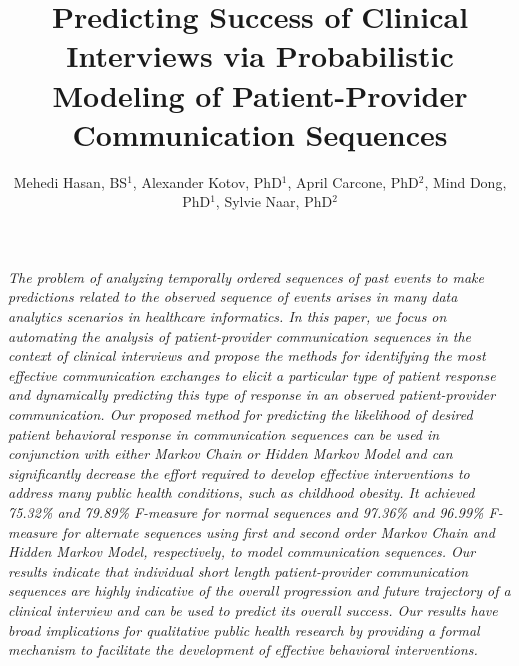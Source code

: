 \documentclass{amia}
\begin{document}
\title{Predicting Success of Clinical Interviews via Probabilistic Modeling of Patient-Provider Communication Sequences}

\author{Mehedi Hasan, BS$^{1}$, Alexander Kotov, PhD$^{1}$, April Carcone, PhD$^{2}$, Mind Dong, PhD$^{1}$, Sylvie Naar, PhD$^{2}$}


\maketitle

\textit{The problem of analyzing temporally ordered sequences of past events to make predictions related to the observed sequence of events arises in many data analytics scenarios in healthcare informatics. In this paper, we focus on automating the analysis of patient-provider communication sequences in the context of clinical interviews and propose the methods for identifying the most effective communication exchanges to elicit a particular type of patient response and dynamically predicting this type of response in an observed patient-provider communication. Our proposed method for predicting the likelihood of desired patient behavioral response in communication sequences can be used in conjunction with either Markov Chain or Hidden Markov Model and can significantly decrease the effort  required to develop effective interventions to address many public health conditions, such as childhood obesity. It achieved 75.32\% and 79.89\% F-measure for normal sequences and 97.36\% and 96.99\% F-measure for alternate sequences using first and second order Markov Chain and Hidden Markov Model, respectively,  to model communication sequences. Our results indicate that individual short length patient-provider communication sequences are highly indicative of the overall progression and future trajectory of a clinical interview and can be used to predict its overall success. Our results have broad implications for qualitative public health research by providing a formal mechanism to facilitate the development of effective behavioral interventions.}
\end{document}
